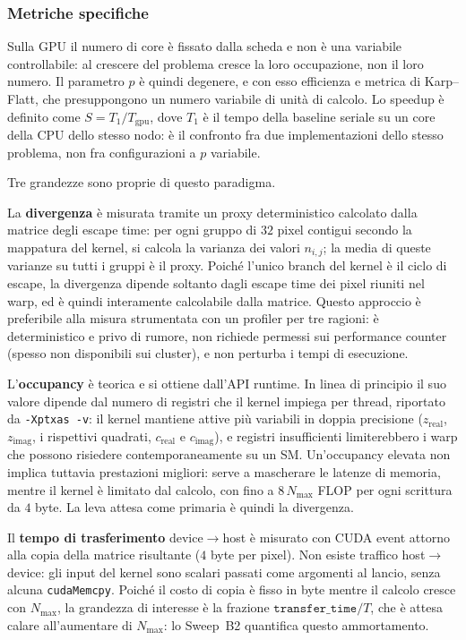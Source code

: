 \subsubsection{Metriche specifiche}
\label{sec:cuda-metriche}

Sulla GPU il numero di core è fissato dalla scheda e non è una variabile
controllabile: al crescere del problema cresce la loro occupazione, non il loro
numero. Il parametro $p$ è quindi degenere, e con esso efficienza e metrica di
Karp--Flatt, che presuppongono un numero variabile di unità di calcolo. Lo
speedup è definito come $S = T_1/T_{\text{gpu}}$, dove $T_1$ è il tempo della
baseline seriale su un core della CPU dello stesso nodo: è il confronto fra due
implementazioni dello stesso problema, non fra configurazioni a $p$ variabile.

Tre grandezze sono proprie di questo paradigma.

La \textbf{divergenza} è misurata tramite un proxy deterministico calcolato
dalla matrice degli escape time: per ogni gruppo di $32$ pixel contigui secondo
la mappatura del kernel, si calcola la varianza dei valori $n_{i,j}$; la media
di queste varianze su tutti i gruppi è il proxy. Poiché l'unico branch del
kernel è il ciclo di escape, la divergenza dipende soltanto dagli escape time dei
pixel riuniti nel warp, ed è quindi interamente calcolabile dalla matrice. Questo approccio è preferibile alla misura
strumentata con un profiler per tre ragioni: è deterministico e privo di rumore,
non richiede permessi sui performance counter (spesso non disponibili sui
cluster), e non perturba i tempi di esecuzione.

L'\textbf{occupancy} è teorica e si ottiene dall'API runtime. In linea di
principio il suo valore dipende dal numero di registri che il kernel impiega per
thread, riportato da \texttt{-Xptxas -v}: il kernel mantiene attive più
variabili in doppia precisione ($z_{\text{real}}$, $z_{\text{imag}}$, i
rispettivi quadrati, $c_{\text{real}}$ e $c_{\text{imag}}$), e registri
insufficienti limiterebbero i warp che possono risiedere contemporaneamente su un
SM. Un'occupancy elevata non implica tuttavia prestazioni migliori: serve a
mascherare le latenze di memoria, mentre il kernel è limitato dal calcolo, con
fino a $8\,N_{\max}$ FLOP per ogni scrittura da $4$ byte. La leva attesa come
primaria è quindi la divergenza.

Il \textbf{tempo di trasferimento} device$\to$host è misurato con CUDA event
attorno alla copia della matrice risultante ($4$ byte per pixel). Non esiste
traffico host$\to$device: gli input del kernel sono scalari passati come
argomenti al lancio, senza alcuna \texttt{cudaMemcpy}.
Poiché il costo di copia è fisso in byte mentre il calcolo cresce con
$N_{\max}$, la grandezza di interesse è la frazione $\texttt{transfer\_time}/T$, che è attesa calare
all'aumentare di $N_{\max}$: lo Sweep~B2 quantifica questo ammortamento.

